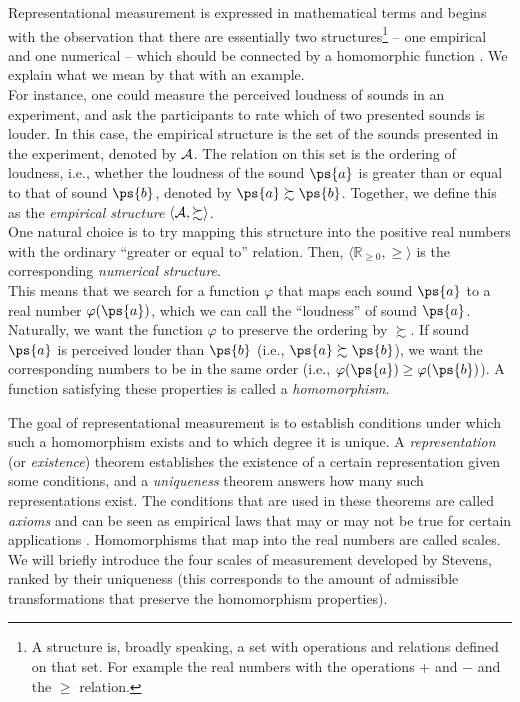 Representational measurement is expressed in mathematical terms and begins with the observation that there are essentially two structures\footnote{A structure is, broadly speaking, a set with operations and relations defined on that set. For example the real numbers with the operations $+$ and $-$ and the $\geq$ relation.} -- one empirical and one numerical -- which should be connected by a homomorphic function \parencite[p. 8]{foundations1}. We explain what we mean by that with an example.\\
For instance, one could measure the perceived loudness of sounds in an experiment, and ask the participants to rate which of two presented sounds is louder.
In this case, the empirical structure is the set of the sounds presented in the experiment, denoted by $\mathcal{A}$.
The relation on this set is the ordering of loudness, i.e., whether the loudness of the sound $\ps{a}$ is greater than or equal to that of sound $\ps{b}$, denoted by $\ps{a} \succsim \ps{b}$. Together, we define this as the \emph{empirical structure} $\langle \mathcal{A}, \succsim \rangle$.\\
One natural choice is to try mapping this structure into the positive real numbers with the ordinary ``greater or equal to'' relation. Then, $\langle \mathbb{R}_{\geq 0}, \geq \rangle$ is the corresponding \emph{numerical structure}.\\
This means that we search for a function $\varphi$ that maps each sound $\ps{a}$ to a real number $\varphi(\ps{a})$, which we can call the ``loudness'' of sound $\ps{a}$. Naturally, we want the function $\varphi$ to preserve the ordering by $\succsim$. If sound $\ps{a}$ is perceived louder than $\ps{b}$ (i.e., $\ps{a} \succsim \ps{b}$), we want the corresponding numbers to be in the same order (i.e., $\varphi(\ps{a}) \geq \varphi(\ps{b})$). A function satisfying these properties is called a \emph{homomorphism}.

The goal of representational measurement is to establish conditions under which such a homomorphism exists and to which degree it is unique. A \emph{representation} (or \emph{existence}) theorem establishes the existence of a certain representation given some conditions, and a \emph{uniqueness} theorem answers how many such representations exist. The conditions that are used in these theorems are called \emph{axioms} and can be seen as empirical laws that may or may not be true for certain applications \parencite[pp. 6-13]{foundations1}.
Homomorphisms that map into the real numbers are called scales. We will briefly introduce the four scales of measurement developed by Stevens, ranked by their uniqueness (this corresponds to the amount of admissible transformations that preserve the homomorphism properties).

